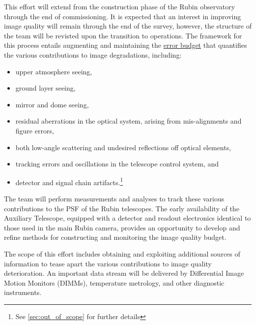 \documentclass[SE,authoryear,toc]{lsstdoc}
\begin{document}
This effort will extend from the construction phase of the Rubin observatory through the end of commissioning.
It is expected that an interest in improving image quality will remain through the end of the survey, however, the structure of the team will be revisted upon the transition to operations.
The framework for this process entails augmenting and maintaining the \href{https://ls.st/Document-17258}{error budget} that quantifies the various contributions to image degradations, including:
\begin{itemize}
\item upper atmosphere seeing,
\item ground layer seeing,
\item mirror and dome seeing,
\item residual aberrations in the optical system, arising from mis-alignments and figure errors,
\item both low-angle scattering and undesired reflections off optical elements,
\item tracking errors and oscillations in the telescope control system, and
\item detector and signal chain artifacts.\footnote{See \ref{sec:out_of_scope} for further details}
\end{itemize}

The team will perform measurements and analyses to track these various contributions to the PSF of the Rubin telescopes.
The early availability of the Auxiliary Telescope, equipped with a detector and readout electronics identical to those used in the main Rubin camera, provides an opportunity to develop and refine methods for constructing and monitoring the image quality budget.

The scope of this effort includes obtaining and exploiting additional sources of information to tease apart the various contributions to image quality deterioration.
An important data stream will be delivered by Differential Image Motion Monitors (DIMMs), temperature metrology, and other diagnostic instruments.
\end{document}
